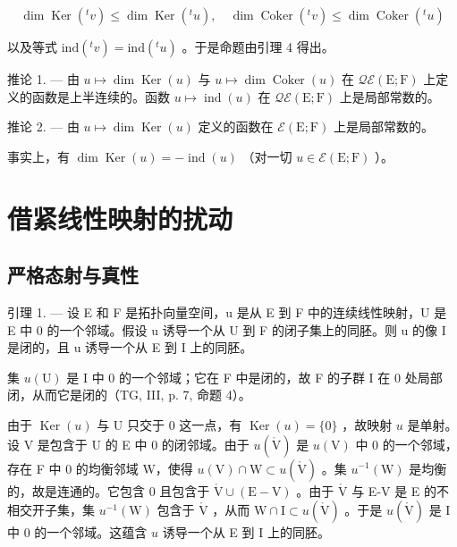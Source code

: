 \[
\dim \operatorname{Ker} (^ {t} v) \leqslant \dim \operatorname{Ker} (^ {t} u), \quad \dim \operatorname{Coker} (^ {t} v) \leqslant \dim \operatorname{Coker} (^ {t} u)
\]

以及等式 \(\mathrm{ind}(^{t}v)=\mathrm{ind}(^{t}u)\) 。于是命题由引理 4 得出。

推论 1. --- 由 \(u \mapsto \dim \operatorname{Ker}(u)\) 与 \(u \mapsto \dim \operatorname{Coker}(u)\) 在 \(\mathcal{Q}\mathcal{E}(\mathrm{E};\mathrm{F})\) 上定义的函数是上半连续的。函数 \(u \mapsto \operatorname{ind}(u)\) 在 \(\mathcal{Q}\mathcal{E}(\mathrm{E};\mathrm{F})\) 上是局部常数的。

推论 2. --- 由 \(u \mapsto \dim \operatorname{Ker}(u)\) 定义的函数在 \(\mathcal{E}(\mathrm{E};\mathrm{F})\) 上是局部常数的。

事实上，有 \(\dim \operatorname{Ker}(u) = -\operatorname{ind}(u)\) （对一切 \(u \in \mathcal{E}(\mathrm{E};\mathrm{F})\) ）。

\section{借紧线性映射的扰动}

\subsection{严格态射与真性}

引理 1. --- 设 E 和 F 是拓扑向量空间，u 是从 E 到 F 中的连续线性映射，U 是 E 中 0 的一个邻域。假设 u 诱导一个从 U 到 F 的闭子集上的同胚。则 u 的像 I 是闭的，且 u 诱导一个从 E 到 I 上的同胚。

集 \(u(\mathrm{U})\) 是 I 中 0 的一个邻域；它在 F 中是闭的，故 F 的子群 I 在 0 处局部闭，从而它是闭的（TG, III, p. 7, 命题 4）。

由于 \(\operatorname{Ker}(u)\) 与 U 只交于 0 这一点，有 \(\operatorname{Ker}(u) = \{0\}\) ，故映射 \(u\) 是单射。设 V 是包含于 U 的 E 中 0 的闭邻域。由于 \(u(\mathring{\mathrm{V}})\) 是 \(u(\mathrm{V})\) 中 0 的一个邻域，存在 F 中 0 的均衡邻域 W，使得 \(u(\mathrm{V}) \cap \mathrm{W} \subset u(\mathring{\mathrm{V}})\) 。集 \(u^{-1}(\mathrm{W})\) 是均衡的，故是连通的。它包含 0 且包含于 \(\mathring{\mathrm{V}} \cup (\mathrm{E} - \mathrm{V})\) 。由于 \(\mathring{\mathrm{V}}\) 与 E-V 是 E 的不相交开子集，集 \(u^{-1}(\mathrm{W})\) 包含于 \(\mathring{\mathrm{V}}\) ，从而 \(\mathrm{W} \cap \mathrm{I} \subset u(\mathring{\mathrm{V}})\) 。于是 \(u(\mathring{\mathrm{V}})\) 是 I 中 0 的一个邻域。这蕴含 \(u\) 诱导一个从 E 到 I 上的同胚。

